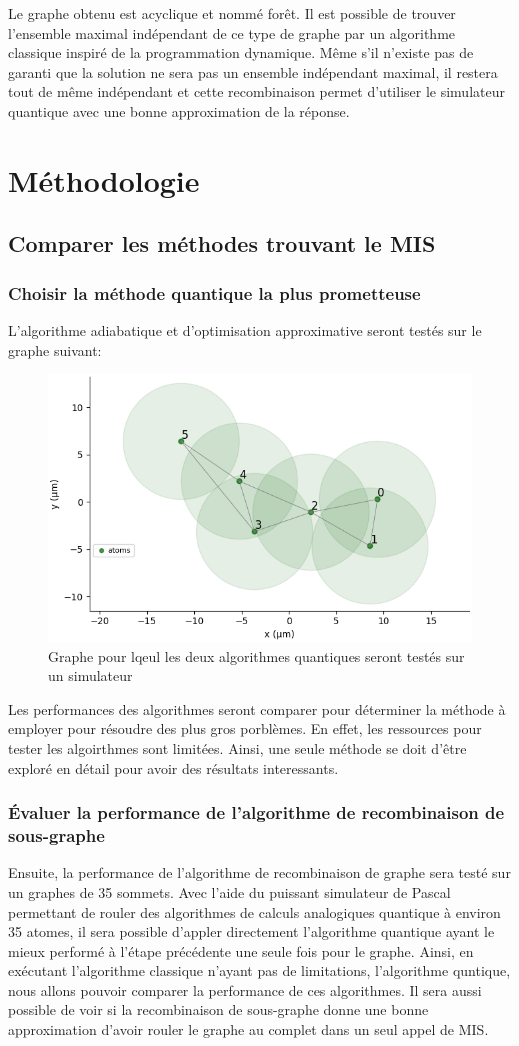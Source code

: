 \documentclass[11pt]{article}
\begin{document}
Le graphe obtenu est acyclique et nommé forêt. Il est possible de trouver l'ensemble maximal indépendant de ce type de graphe par un algorithme classique inspiré de la programmation dynamique. Même s'il n'existe pas de garanti que la solution ne sera pas un ensemble indépendant maximal, il restera tout de même indépendant et cette recombinaison permet d'utiliser le simulateur quantique avec une bonne approximation de la réponse.

\section{Méthodologie}

\subsection{Comparer les méthodes trouvant le MIS}
\subsubsection{Choisir la méthode quantique la plus prometteuse}
L'algorithme adiabatique et d'optimisation approximative seront testés sur le graphe suivant: 

\begin{figure}[H]
    \centering
    \includegraphics[width = 0.48\linewidth]{images/registre_exemple2.png}
    \caption{Graphe pour lqeul les deux algorithmes quantiques seront testés sur un simulateur}
\end{figure}\label{graphtocompare}

Les performances des algorithmes seront comparer pour déterminer la méthode à employer pour résoudre des plus gros porblèmes. En effet, les ressources pour tester les algoirthmes sont limitées. Ainsi, une seule méthode se doit d'être exploré en détail pour avoir des résultats interessants.

\subsubsection{Évaluer la performance de l'algorithme de recombinaison de sous-graphe}
Ensuite, la performance de l'algorithme de recombinaison de graphe sera testé sur un graphes de 35 sommets. Avec l'aide du puissant simulateur de Pascal permettant de rouler des algorithmes de calculs analogiques quantique à environ 35 atomes, il sera possible d'appler directement l'algorithme quantique ayant le mieux performé à l'étape précédente une seule fois pour le graphe. Ainsi, en exécutant l'algorithme classique n'ayant pas de limitations, l'algorithme quntique, nous allons pouvoir comparer la performance de ces algorithmes. Il sera aussi possible de voir si la recombinaison de sous-graphe donne une bonne approximation d'avoir rouler le graphe au complet dans un seul appel de MIS.
\end{document}
